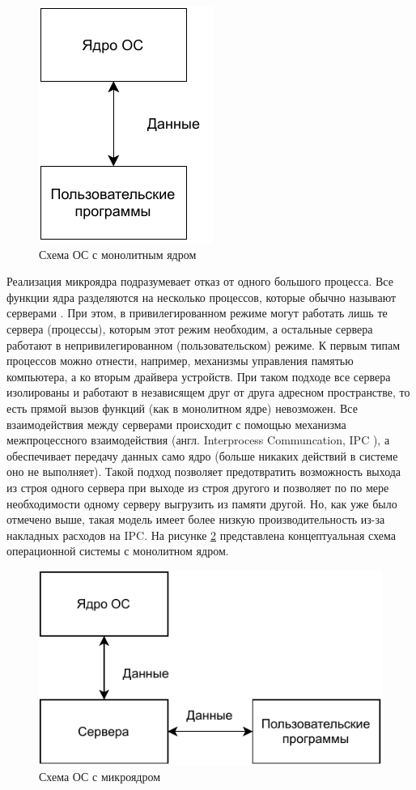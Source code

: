\begin{figure}[h]
	\centering
	\includegraphics[scale=2]{img/monolithic_kernel.pdf}
	\caption{Схема ОС с монолитным ядром}
	\label{fig:monolithic kernel}
\end{figure}
 
Реализация микроядра подразумевает отказ от одного большого процесса. Все функции ядра разделяются на несколько процессов, которые обычно называют серверами \cite{kernel-development}. При этом, в привилегированном режиме могут работать лишь те сервера (процессы), которым этот режим необходим, а остальные сервера работают в непривилегированном (пользовательском) режиме. К первым типам процессов можно отнести, например, механизмы управления памятью компьютера, а ко вторым драйвера устройств. При таком подходе все сервера изолированы и работают в независящем друг от друга адресном пространстве, то есть прямой вызов функций (как в монолитном ядре) невозможен. Все взаимодействия между серверами происходит с помощью механизма межпроцессного взаимодействия (англ. Interprocess Communcation, IPC \cite{ipc}), а обеспечивает передачу данных само ядро (больше никаких действий в системе оно не выполняет). Такой подход позволяет предотвратить возможность выхода из строя одного сервера при выходе из строя другого и позволяет по по мере необходимости одному серверу выгрузить из памяти другой. Но, как уже было отмечено выше, такая модель имеет более низкую производительность из-за накладных расходов на IPC. На рисунке \ref{fig:micro_kernel} представлена концептуальная схема операционной системы с монолитном ядром. 

\begin{figure}[h]
	\centering
	\includegraphics[width=\textwidth]{img/micro_kernel.pdf}
	\caption{Схема ОС с микроядром}
	\label{fig:micro_kernel}
\end{figure}

